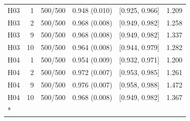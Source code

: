 \begin{longtable}[t]{lrllll}
H03 & 1 & 500/500 & 0.948 (0.010) & {}[0.925, 0.966] & 1.209\\
H03 & 2 & 500/500 & 0.968 (0.008) & {}[0.949, 0.982] & 1.258\\
H03 & 9 & 500/500 & 0.968 (0.008) & {}[0.949, 0.982] & 1.337\\
H03 & 10 & 500/500 & 0.964 (0.008) & {}[0.944, 0.979] & 1.282\\
H04 & 1 & 500/500 & 0.954 (0.009) & {}[0.932, 0.971] & 1.200\\
H04 & 2 & 500/500 & 0.972 (0.007) & {}[0.953, 0.985] & 1.261\\
H04 & 9 & 500/500 & 0.976 (0.007) & {}[0.958, 0.988] & 1.472\\
H04 & 10 & 500/500 & 0.968 (0.008) & {}[0.949, 0.982] & 1.367\\*
\end{longtable}
